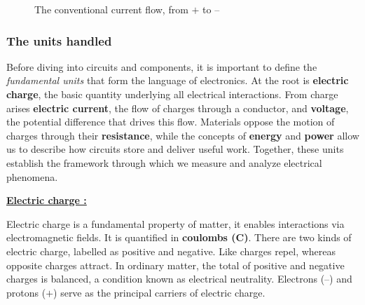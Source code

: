 \documentclass[11pt]{article}
\begin{document}
\begin{figure}[!h]
  \centering
  \caption{The conventional current flow, from \(+\) to --}
\end{figure}

\subsubsection{The units handled}

Before diving into circuits and components, it is important to define
the \textit{fundamental units} that form the language of electronics.
At the root is \textbf{electric charge}, the basic quantity underlying
all electrical interactions. From charge arises \textbf{electric
current}, the flow of charges through a conductor, and \textbf{voltage},
the potential difference that drives this flow. Materials oppose the
motion of charges through their \textbf{resistance}, while the concepts
of \textbf{energy} and \textbf{power} allow us to describe how circuits
store and deliver useful work. Together, these units establish the
framework through which we measure and analyze electrical phenomena.\par
\vspace{\baselineskip}
\textbf{\underline{Electric charge :}}\par
\noindent
Electric charge is a fundamental property of matter, it enables
interactions via electromagnetic fields. It is quantified in \textbf{coulombs
(\unit{\coulomb})}. There are two kinds of electric charge, labelled as
positive and negative. Like charges repel, whereas opposite charges
attract. In ordinary matter, the total of positive and negative
charges is balanced, a condition known as electrical neutrality.
Electrons (--) and protons (\(+\)) serve as the principal carriers of
electric charge.

\begin{figure}[!h]
  \centering
\end{figure}
\end{document}
